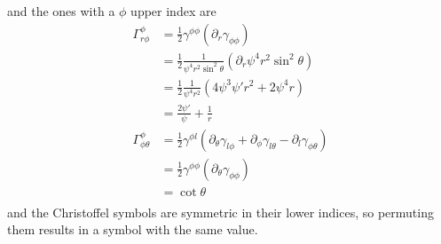 \documentclass[12pt]{article}
\numberwithin{equation}{section}
\begin{document}
and the ones with a $\phi$ upper index are
\begin{equation}
\begin{aligned}
\Gamma^{\phi}_{r \phi} &= \frac{1}{2} \gamma^{\phi \phi} (\partial_r \gamma_{\phi \phi}) \\
&= \frac{1}{2} \frac{1}{\psi^4 r^2 \sin^2 \theta} (\partial_r \psi^4 r^2 \sin^2 \theta) \\
&= \frac{1}{2} \frac{1}{\psi^4 r^2} (4 \psi^3 \psi' r^2 + 2 \psi^4 r) \\
&= \frac{2 \psi'}{\psi} + \frac{1}{r} \\
\Gamma^{\phi}_{\phi \theta} &= \frac{1}{2} \gamma^{\phi l} (\partial_\theta \gamma_{l \phi} + \partial_\phi \gamma_{l \theta} - \partial_l \gamma_{\phi \theta}) \\
&= \frac{1}{2} \gamma^{\phi \phi} (\partial_\theta \gamma_{\phi \phi}) \\
&= \cot \theta \\
\end{aligned}
\end{equation}
and the Christoffel symbols are symmetric in their lower indices, so permuting them results in a symbol with the same value.
\end{document}
